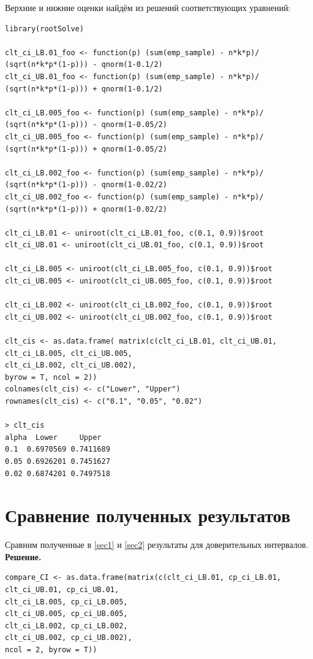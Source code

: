 \documentclass[14pt,a4paper]{scrartcl}
\begin{document}
\newpage
Верхние и нижние оценки найдём из решений соответствующих уравнений:
\begin{verbatim}
library(rootSolve)

clt_ci_LB.01_foo <- function(p) (sum(emp_sample) - n*k*p)/
(sqrt(n*k*p*(1-p))) - qnorm(1-0.1/2)
clt_ci_UB.01_foo <- function(p) (sum(emp_sample) - n*k*p)/
(sqrt(n*k*p*(1-p))) + qnorm(1-0.1/2)

clt_ci_LB.005_foo <- function(p) (sum(emp_sample) - n*k*p)/
(sqrt(n*k*p*(1-p))) - qnorm(1-0.05/2)
clt_ci_UB.005_foo <- function(p) (sum(emp_sample) - n*k*p)/
(sqrt(n*k*p*(1-p))) + qnorm(1-0.05/2)

clt_ci_LB.002_foo <- function(p) (sum(emp_sample) - n*k*p)/
(sqrt(n*k*p*(1-p))) - qnorm(1-0.02/2)
clt_ci_UB.002_foo <- function(p) (sum(emp_sample) - n*k*p)/
(sqrt(n*k*p*(1-p))) + qnorm(1-0.02/2)

clt_ci_LB.01 <- uniroot(clt_ci_LB.01_foo, c(0.1, 0.9))$root
clt_ci_UB.01 <- uniroot(clt_ci_UB.01_foo, c(0.1, 0.9))$root

clt_ci_LB.005 <- uniroot(clt_ci_LB.005_foo, c(0.1, 0.9))$root
clt_ci_UB.005 <- uniroot(clt_ci_UB.005_foo, c(0.1, 0.9))$root

clt_ci_LB.002 <- uniroot(clt_ci_LB.002_foo, c(0.1, 0.9))$root
clt_ci_UB.002 <- uniroot(clt_ci_UB.002_foo, c(0.1, 0.9))$root

clt_cis <- as.data.frame( matrix(c(clt_ci_LB.01, clt_ci_UB.01,
clt_ci_LB.005, clt_ci_UB.005,
clt_ci_LB.002, clt_ci_UB.002), 
byrow = T, ncol = 2))
colnames(clt_cis) <- c("Lower", "Upper")
rownames(clt_cis) <- c("0.1", "0.05", "0.02")

> clt_cis
alpha  Lower     Upper
0.1  0.6970569 0.7411689
0.05 0.6926201 0.7451627
0.02 0.6874201 0.7497518
\end{verbatim}

\section{Сравнение полученных результатов}
Сравним полученные в \ref{sec1} и \ref{sec2} результаты для доверительных интервалов.\\
\textbf{Решение.}\\
\begin{verbatim}
compare_CI <- as.data.frame(matrix(c(clt_ci_LB.01, cp_ci_LB.01, 
clt_ci_UB.01, cp_ci_UB.01,
clt_ci_LB.005, cp_ci_LB.005,
clt_ci_UB.005, cp_ci_UB.005,
clt_ci_LB.002, cp_ci_LB.002,
clt_ci_UB.002, cp_ci_UB.002), 
ncol = 2, byrow = T))
\end{verbatim}
\end{document}
